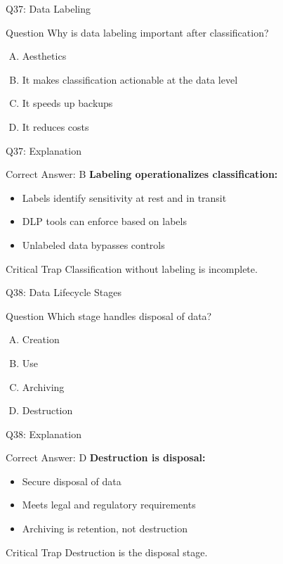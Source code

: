 \documentclass{beamer}
\begin{document}
	\begin{frame}{Q37: Data Labeling}
		\begin{block}{Question}
			Why is data labeling important after classification?
		\end{block}
		\begin{enumerate}[(A)]
			\item Aesthetics
			\item It makes classification actionable at the data level
			\item It speeds up backups
			\item It reduces costs
		\end{enumerate}
	\end{frame}
	
	\begin{frame}{Q37: Explanation}
		\begin{block}{Correct Answer: B}
			\textbf{Labeling operationalizes classification:}
			\begin{itemize}
				\item Labels identify sensitivity at rest and in transit
				\item DLP tools can enforce based on labels
				\item Unlabeled data bypasses controls
			\end{itemize}
		\end{block}
		\begin{alertblock}{Critical Trap}
			Classification without labeling is incomplete.
		\end{alertblock}
	\end{frame}
	
	\begin{frame}{Q38: Data Lifecycle Stages}
		\begin{block}{Question}
			Which stage handles disposal of data?
		\end{block}
		\begin{enumerate}[(A)]
			\item Creation
			\item Use
			\item Archiving
			\item Destruction
		\end{enumerate}
	\end{frame}
	
	\begin{frame}{Q38: Explanation}
		\begin{block}{Correct Answer: D}
			\textbf{Destruction is disposal:}
			\begin{itemize}
				\item Secure disposal of data
				\item Meets legal and regulatory requirements
				\item Archiving is retention, not destruction
			\end{itemize}
		\end{block}
		\begin{alertblock}{Critical Trap}
			Destruction is the disposal stage.
		\end{alertblock}
	\end{frame}
	
\end{document}
